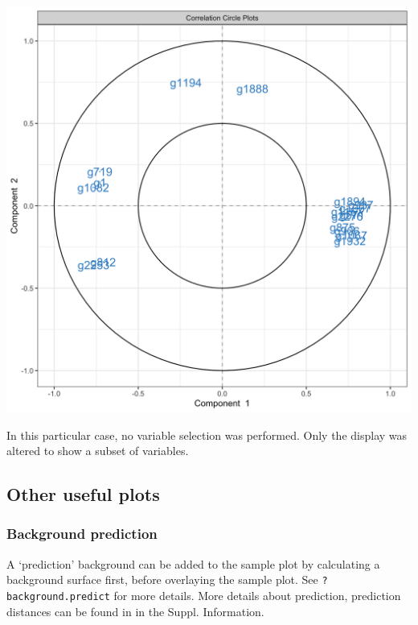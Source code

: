 \documentclass[]{book}
\newenvironment{Shaded}{\begin{snugshade}}{\end{snugshade}}
\newcommand{\DataTypeTok}[1]{\textcolor[rgb]{0.13,0.29,0.53}{#1}}
\newcommand{\DecValTok}[1]{\textcolor[rgb]{0.00,0.00,0.81}{#1}}
\newcommand{\KeywordTok}[1]{\textcolor[rgb]{0.13,0.29,0.53}{\textbf{#1}}}
\newcommand{\NormalTok}[1]{#1}
\newcommand{\OperatorTok}[1]{\textcolor[rgb]{0.81,0.36,0.00}{\textbf{#1}}}
\newcommand{\OtherTok}[1]{\textcolor[rgb]{0.56,0.35,0.01}{#1}}
\newcommand{\StringTok}[1]{\textcolor[rgb]{0.31,0.60,0.02}{#1}}
\begin{document}
\begin{center}\includegraphics[width=0.75\linewidth,]{Figures/04-plsda-plotVar-cutoff-1} \end{center}

In this particular case, no variable selection was performed. Only the display was altered to show a subset of variables.

\hypertarget{other-useful-plots-1}{%
\subsection{Other useful plots}\label{other-useful-plots-1}}

\hypertarget{background-prediction}{%
\subsubsection{Background prediction}\label{background-prediction}}

A `prediction' background can be added to the sample plot by calculating a background surface first, before overlaying the sample plot. See \texttt{?background.predict} for more details. More details about prediction, prediction distances can be found in \citep{mixomics} in the Suppl. Information.

\begin{Shaded}
\end{Shaded}
\end{document}
